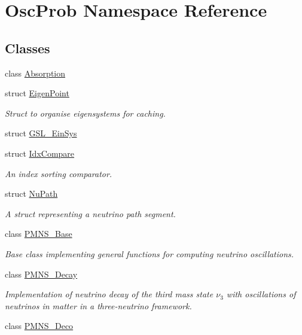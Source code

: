 \hypertarget{namespaceOscProb}{}\section{Osc\+Prob Namespace Reference}
\label{namespaceOscProb}
\subsection*{Classes}
\begin{DoxyCompactItemize}
\item 
class \hyperlink{classOscProb_1_1Absorption}{Absorption}
\item 
struct \hyperlink{structOscProb_1_1EigenPoint}{Eigen\+Point}
\begin{DoxyCompactList}\small\item\em Struct to organise eigensystems for caching. \end{DoxyCompactList}\item 
struct \hyperlink{structOscProb_1_1GSL__EinSys}{G\+S\+L\+\_\+\+Ein\+Sys}
\item 
struct \hyperlink{structOscProb_1_1IdxCompare}{Idx\+Compare}
\begin{DoxyCompactList}\small\item\em An index sorting comparator. \end{DoxyCompactList}\item 
struct \hyperlink{structOscProb_1_1NuPath}{Nu\+Path}
\begin{DoxyCompactList}\small\item\em A struct representing a neutrino path segment. \end{DoxyCompactList}\item 
class \hyperlink{classOscProb_1_1PMNS__Base}{P\+M\+N\+S\+\_\+\+Base}
\begin{DoxyCompactList}\small\item\em Base class implementing general functions for computing neutrino oscillations. \end{DoxyCompactList}\item 
class \hyperlink{classOscProb_1_1PMNS__Decay}{P\+M\+N\+S\+\_\+\+Decay}
\begin{DoxyCompactList}\small\item\em Implementation of neutrino decay of the third mass state $\nu_3$ with oscillations of neutrinos in matter in a three-\/neutrino framework. \end{DoxyCompactList}\item 
class \hyperlink{classOscProb_1_1PMNS__Deco}{P\+M\+N\+S\+\_\+\+Deco}

\end{DoxyCompactItemize}

